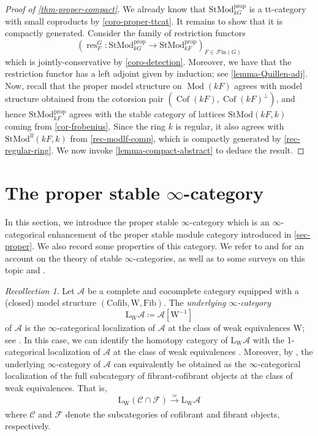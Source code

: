 \documentclass{amsart}
\newcommand{\res}{\operatorname{res}\nolimits}
\def \A{{\mathcal A}}
\def \C{{\mathcal C}}
\def \F{{\mathcal F}}
\def \Fin{{\mathcal{F}\textrm{in}}}
\DeclareMathOperator{\Mod}{Mod}
\DeclareMathOperator{\Cof}{Cof}
\numberwithin{equation}{section}%
\theoremstyle{remark}
\newtheorem{recollection}[equation]{Recollection}
\begin{document}
{\begin{proof}[Proof of \cref{thm-proper-compact}]
    We already know that $\mathrm{StMod}^{\mathrm{prop}}_{kG}$ is a tt-category with small coproducts by \cref{coro-proper-ttcat}. It remains to show that it is compactly generated. Consider the family of restriction functors 
\[
 (\res^G_F \colon \mathrm{StMod}^{\mathrm{prop}}_{kG}\to \mathrm{StMod}^{\mathrm{prop}}_{kF})_{F\in \Fin(G)}
 \]
 which is jointly-conservative by \cref{coro-detection}. Moreover, we have that the restriction functor has a left adjoint given by induction; see \cref{lemma-Quillen-adj}. Now, recall that the proper model structure on $\Mod(kF)$ agrees with model structure obtained from the cotorsion pair $(\Cof(kF),\Cof(kF)^\perp)$, and hence $\mathrm{StMod}^{\mathrm{prop}}_{kF}$ agrees with the stable category of lattices $\mathrm{StMod}(kF,k)$ coming from \cref{cor-frobenius}. Since the ring $k$ is regular, it also agrees with $\mathrm{StMod}^{\mathrm{lf}}(kF,k)$ from \cref{rec-modlf-comp},   which is compactly generated by \cref{rec-regular-ring}. We now invoke \cref{lemma-compact-abstract} to deduce the result. 
\end{proof}

\section{The proper stable $\infty$-category}\label{sec-infty}


In  this section, we introduce the proper stable $\infty$-category which is an $\infty$-categorical enhancement of the proper stable module category introduced in \cref{sec-proper}. We also record some properties of this category. We refer to \cite{Lur17} and \cite{Cis19} for an account on the theory of stable $\infty$-categories, as well as to some surveys on this topic \cite{Ant16} and \cite{Jas26}. 

\begin{recollection} 
    Let $\A$ be a complete and cocomplete category equipped with  a (closed) model structure $(\mathrm{Cofib}, \mathrm{W},\mathrm{Fib})$. The \textit{underlying $\infty$-category}  
    \[
    \mathrm{L}_\mathrm{W}\A\coloneqq \A[\mathrm{W}^{-1}]
    \]
    of $\A$ is the $\infty$-categorical localization of $\A$ at the class of weak equivalences $\mathrm{W}$; see \cite[Definition 1.3.4.1]{Lur17}. In this case, we can identify the homotopy category of $\mathrm{L}_\mathrm{W}\A$ with the 1-categorical
localization of $\A$ at the class of weak equivalences \cite[Remark 7.1.6]{Cis19}. Moreover, by \cite[Remark 1.3.4.16]{Lur17}, the underlying $\infty$-category of $\A$ can equivalently be obtained as the $\infty$-categorical localization of the full subcategory of fibrant-cofibrant objects at the class of weak equivalences. That is, 
\[
\mathrm{L}_\mathrm{W}(\C\cap \F) \xrightarrow[]{\simeq} \mathrm{L}_\mathrm{W}\A
\]
where $\C$ and $\F$ denote the subcategories of cofibrant and fibrant objects, respectively. 
\end{recollection}


}
\end{document}
